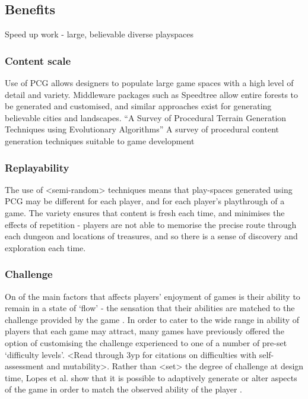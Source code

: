 \documentclass{acm_proc_article-sp}
\begin{document}
\subsection{Benefits}
Speed up work - large, believable diverse playspaces\\


\subsubsection{Content scale}
Use of PCG allows designers to populate large game spaces with a high level of detail and variety. Middleware packages such as Speedtree\cite{speedtree} allow entire forests to be generated and customised, and similar approaches exist for generating believable cities and landscapes.
``A Survey of Procedural Terrain Generation Techniques using Evolutionary Algorithms'' \cite{raffe2012survey}
A survey of procedural content generation techniques suitable to game development \cite{carli2011survey}

\subsubsection{Replayability}
The use of <semi-random> techniques means that play-spaces generated using PCG may be different for each player, and for each player's playthrough of a game. The variety ensures that content is fresh each time, and minimises the effects of repetition - players are not able to memorise the precise route through each dungeon and locations of treasures, and so there is a sense of discovery and exploration each time.

\subsubsection{Challenge}
On of the main factors that affects players' enjoyment of games is their ability to remain in a state of `flow' - the sensation that their abilities are matched to the challenge provided by the game \cite{flow}.
In order to cater to the wide range in ability of players that each game may attract, many games have previously offered the option of customising the challenge experienced to one of a number of pre-set `difficulty levels'. <Read through 3yp for citations on difficulties with self-assessment and mutability>. Rather than <set> the degree of challenge at design time, Lopes et al. show that it is possible to adaptively generate or alter aspects of the game \cite{lopes2011adaptivity} in order to match the observed ability of the player \cite{ResE5}.
\end{document}
